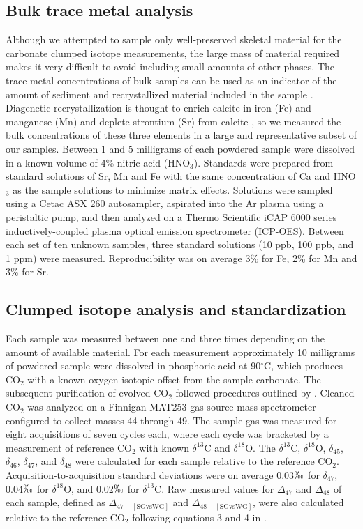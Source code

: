 \documentclass[5p, authoryear]{elsarticle}
\begin{document}
\subsection{Bulk trace metal analysis}

Although we attempted to sample only well-preserved skeletal material for the carbonate clumped isotope measurements, the large mass of material required makes it very difficult to avoid including small amounts of other phases. The trace metal concentrations of bulk samples can be used as an indicator of the amount of sediment and recrystallized material included in the sample \citep{Azmy1998, Brand2012, Came2007, Finnegan2011}. Diagenetic recrystallization is thought to enrich calcite in iron (Fe) and manganese (Mn) and deplete strontium (Sr) from calcite \citep{Brand1980, Shields2003}, so we measured the bulk concentrations of these three elements in a large and representative subset of our samples. Between 1 and 5 milligrams of each powdered sample were dissolved in a known volume of 4\% nitric acid (HNO$_3$). Standards were prepared from standard solutions of Sr, Mn and Fe with the same concentration of Ca and HNO$_3$ as the sample solutions to minimize matrix effects. Solutions were sampled using a Cetac ASX 260 autosampler, aspirated into the Ar plasma using a peristaltic pump, and then analyzed on a Thermo Scientific iCAP 6000 series inductively-coupled plasma optical emission spectrometer (ICP-OES). Between each set of ten unknown samples, three standard solutions (10 ppb, 100 ppb, and 1 ppm) were measured. Reproducibility was on average 3\% for Fe, 2\% for Mn and 3\% for Sr.  

\subsection{Clumped isotope analysis and standardization}

Each sample was measured between one and three times depending on the amount of available material. For each measurement approximately 10 milligrams of powdered sample were dissolved in phosphoric acid at 90$^{\circ}$C, which produces CO$_2$ with a known oxygen isotopic offset from the sample carbonate. The subsequent purification of evolved CO$_2$ followed procedures outlined by \cite{Ghosh2006}. Cleaned CO$_2$ was analyzed on a Finnigan MAT253 gas source mass spectrometer configured to collect masses 44 through 49. The sample gas was measured for eight acquisitions of seven cycles each, where each cycle was bracketed by a measurement of reference CO$_2$ with known $\delta^{13}$C and $\delta^{18}$O. The $\delta^{13}$C, $\delta^{18}$O, $\delta_{45}$, $\delta_{46}$, $\delta_{47}$, and $\delta_{48}$ were calculated for each sample relative to the reference CO$_2$. Acquisition-to-acquisition standard deviations were on average 0.03$\permil$ for $\delta_{47}$, 0.04$\permil$ for $\delta^{18}$O, and 0.02$\permil$ for $\delta^{13}$C. Raw measured values for $\Delta_{47}$ and $\Delta_{48}$ of each sample, defined as $\Delta_{47-[\text{SGvsWG}]}$ and $\Delta_{48-[\text{SGvsWG}]}$, were also calculated relative to the reference CO$_2$ following equations 3 and 4 in \cite{Huntington2009}.
\end{document}
